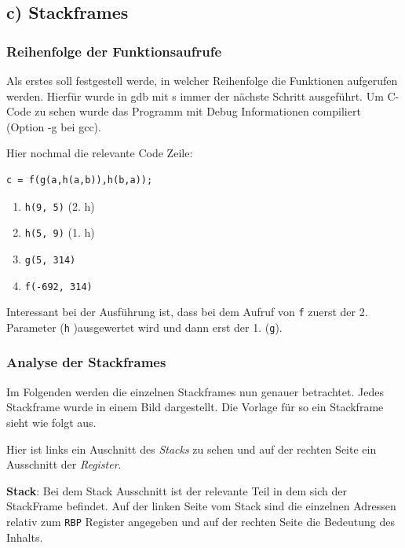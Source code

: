 \documentclass[12pt]{article}
\begin{document}
\subsection{c) Stackframes}

\subsubsection{Reihenfolge der Funktionsaufrufe}

Als erstes soll festgestell werde, in welcher Reihenfolge die Funktionen aufgerufen werden. Hierfür wurde in gdb mit s immer der nächste Schritt ausgeführt. Um C-Code zu sehen wurde das Programm mit Debug Informationen compiliert (Option -g bei gcc).

Hier nochmal die relevante Code Zeile:
\begin{lstlisting}
c = f(g(a,h(a,b)),h(b,a));
\end{lstlisting}


\begin{enumerate}
\item \texttt{h(9, 5)} (2. h)
\item \texttt{h(5, 9)} (1. h)
\item \texttt{g(5, 314)}
\item \texttt{f(-692, 314)}
\end{enumerate}

Interessant bei der Ausführung ist, dass bei dem Aufruf von \texttt{f} zuerst der 2. Parameter (\texttt{h} )ausgewertet wird und dann erst der 1. (\texttt{g}).

\subsubsection{Analyse der Stackframes}


Im Folgenden werden die einzelnen Stackframes nun genauer betrachtet. Jedes Stackframe wurde in einem Bild dargestellt. Die Vorlage für so ein Stackframe sieht wie folgt aus. 


Hier ist links ein Auschnitt des \textit{Stacks} zu sehen und auf der rechten Seite ein Ausschnitt der \textit{Register}. 

\textbf{Stack}: \newline
Bei dem Stack Ausschnitt ist der relevante Teil in dem sich der StackFrame befindet. Auf der linken Seite vom Stack sind die einzelnen Adressen relativ zum \texttt{RBP} Register angegeben und auf der rechten Seite die Bedeutung des Inhalts. 
\end{document}
